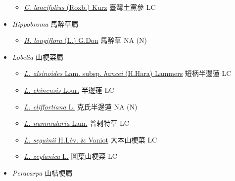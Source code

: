 \begin{itemize}
  \begin{itemize}
        \item[] \href{http://www.theplantlist.org/tpl1.1/search?q=Cyclocodon+lancifolius}{\textit{C. lancifolius} (Roxb.) Kurz}   臺灣土黨參   LC
  \end{itemize}
 \item[] \textit{Hippobroma} 馬醉草屬
                                
  \begin{itemize}
        \item[] \href{http://www.theplantlist.org/tpl1.1/search?q=Hippobroma+longiflora}{\textit{H. longiflora} (L.) G.Don}   馬醉草   NA (N)
  \end{itemize}
 \item[] \textit{Lobelia} 山梗菜屬
                                
  \begin{itemize}
        \item[] \href{http://www.theplantlist.org/tpl1.1/search?q=Lobelia+alsinoides+subsp.+hancei}{\textit{L. alsinoides} Lam. subsp. \textit{hancei} (H.Hara) Lammers}   短柄半邊蓮   LC
        \item[] \href{http://www.theplantlist.org/tpl1.1/search?q=Lobelia+chinensis}{\textit{L. chinensis} Lour.}   半邊蓮   LC
        \item[] \href{http://www.theplantlist.org/tpl1.1/search?q=Lobelia+cliffortiana}{\textit{L. cliffortiana} L.}   克氏半邊蓮   NA (N)
        \item[] \href{http://www.theplantlist.org/tpl1.1/search?q=Lobelia+nummularia}{\textit{L. nummularia} Lam.}   普剌特草   LC
        \item[] \href{http://www.theplantlist.org/tpl1.1/search?q=Lobelia+seguinii}{\textit{L. seguinii} H.Lév. \& Vaniot}   大本山梗菜   LC
        \item[] \href{http://www.theplantlist.org/tpl1.1/search?q=Lobelia+zeylanica}{\textit{L. zeylanica} L.}   圓葉山梗菜   LC
  \end{itemize}
 \item[] \textit{Peracarpa} 山桔梗屬
                                

\end{itemize}
